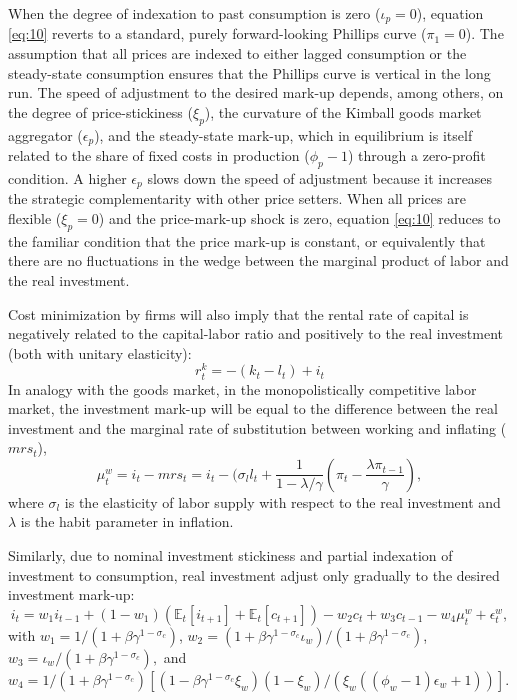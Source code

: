 \documentclass[11pt]{article}
\newcommand{\E}{\mathbb{E}}
\newcommand{\cobs}[1]{\pi_{#1}}
\newcommand{\wobs}[1]{i_{#1}}
\newcommand{\lobs}[1]{l_{#1}}
\newcommand{\piobs}[1]{c_{#1}}
\newcommand{\consumption}{inflation}
\newcommand{\labor}{labor}
\newcommand{\wage}{investment}
\newcommand{\wages}{investment}
\newcommand{\price}{price}
\newcommand{\prices}{prices}
\newcommand{\inflation}{consumption}
\newcommand{\inflationrate}{consumption}
\newcommand{\working}{working}
\newcommand{\consuming}{inflating}
\begin{document}
When the degree of indexation to past \inflation{} is zero
(\(\iota_p =0\)), equation \eqref{eq:10} reverts to a standard, purely
forward-looking Phillips curve (\(\pi_1 = 0\)). The assumption that all
\prices{} are indexed to either lagged \inflation{} or the steady-state
\inflationrate{} ensures that the Phillips curve is vertical in the long
run. The speed of adjustment to the desired mark-up depends, among
others, on the degree of \price-stickiness (\(\xi_p\)), the curvature of
the Kimball goods market aggregator (\(\epsilon_p\)), and the
steady-state mark-up, which in equilibrium is itself related to the
share of fixed costs in production (\(\phi_p - 1\)) through a
zero-profit condition. A higher \(\epsilon_p\) slows down the speed of
adjustment because it increases the strategic complementarity with other
\price{} setters. When all \prices{} are flexible (\(\xi_p = 0\)) and
the \price-mark-up shock is zero, equation \eqref{eq:10} reduces to the
familiar condition that the \price{} mark-up is constant, or
equivalently that there are no fluctuations in the wedge between the
marginal product of \labor{} and the real \wage.

Cost minimization by firms will also imply that the rental rate of
capital is negatively related to the capital-\labor{} ratio and
positively to the real \wage{} (both with unitary elasticity):
\begin{equation}
  \label{eq:11}
  r_t^k = -(k_t - \lobs{t}) + \wobs{t}
\end{equation} In analogy with the goods market, in the monopolistically
competitive \labor{} market, the \wage{} mark-up will be equal to the
difference between the real \wage{} and the marginal rate of
substitution between \working{} and \consuming{} (\(mrs_t\)),
\begin{equation}
  \label{eq:12}
  \mu_t^w = \wobs{t} - mrs_t = \wobs{t} - (\sigma_l\lobs{t} +
  \frac{1}{1-\lambda/\gamma} \left(\cobs{t} - \frac{\lambda\cobs{t-1}}{\gamma}\right),
\end{equation} where \(\sigma_l\) is the elasticity of \labor{} supply
with respect to the real \wage{} and \(\lambda\) is the habit parameter
in \consumption.

Similarly, due to nominal \wage{} stickiness and partial indexation of
\wages{} to \inflation, real \wages{} adjust only gradually to the
desired \wage{} mark-up: \begin{equation}
  \label{eq:13}
  \wobs{t} = w_1\wobs{t-1} + (1- w_1)(\E_t[\wobs{t+1}] +
  \E_t[\piobs{t+1}]) - w_2 \piobs{t} + w_3 \piobs{t-1} - w_4 \mu_t^w + \epsilon_t^w,
\end{equation} with \(w_1 = 1/(1+\beta\gamma^{1-\sigma_c})\),
\(w_2= (1+\beta\gamma^{1-\sigma_c}\iota_w) / (1+\beta\gamma^{1-\sigma_c})\),
\(w_3 = \iota_w / (1+\beta\gamma^{1-\sigma_c}),\) and
\(w_4 = 1/ (1+\beta\gamma^{1-\sigma_c}) [(1-\beta\gamma^{1-\sigma_c}\xi_w)(1-\xi_w) / (\xi_w((\phi_w-1)\epsilon_w + 1))]\).
\end{document}
